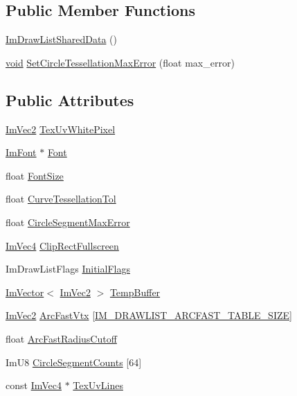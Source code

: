 \subsection*{Public Member Functions}
\begin{DoxyCompactItemize}
\item 
\hyperlink{structImDrawListSharedData_a3fe9d30c0df68cce4db9d2033ba9a589}{Im\+Draw\+List\+Shared\+Data} ()
\item 
\hyperlink{imgui__impl__opengl3__loader_8h_ac668e7cffd9e2e9cfee428b9b2f34fa7}{void} \hyperlink{structImDrawListSharedData_adc947304370a6d5ee55a44190e923c8d}{Set\+Circle\+Tessellation\+Max\+Error} (float max\+\_\+error)
\end{DoxyCompactItemize}
\subsection*{Public Attributes}
\begin{DoxyCompactItemize}
\item 
\hyperlink{structImVec2}{Im\+Vec2} \hyperlink{structImDrawListSharedData_a8dff5fc643cab17128012383d75d9ad8}{Tex\+Uv\+White\+Pixel}
\item 
\hyperlink{structImFont}{Im\+Font} $\ast$ \hyperlink{structImDrawListSharedData_a4542431d4afe5320a965fbe52a3cc39f}{Font}
\item 
float \hyperlink{structImDrawListSharedData_a189a412fcd4f66a1d60501ad758d04bd}{Font\+Size}
\item 
float \hyperlink{structImDrawListSharedData_a5b5bb46f5fd714b43e4b73a131b7f6f7}{Curve\+Tessellation\+Tol}
\item 
float \hyperlink{structImDrawListSharedData_a2343a659b6e750ab09401615b967df10}{Circle\+Segment\+Max\+Error}
\item 
\hyperlink{structImVec4}{Im\+Vec4} \hyperlink{structImDrawListSharedData_ac8737a7aae92c55d75998a6c9f6f3882}{Clip\+Rect\+Fullscreen}
\item 
Im\+Draw\+List\+Flags \hyperlink{structImDrawListSharedData_a7e00a317793f4ed3ff592b050dfee450}{Initial\+Flags}
\item 
\hyperlink{structImVector}{Im\+Vector}$<$ \hyperlink{structImVec2}{Im\+Vec2} $>$ \hyperlink{structImDrawListSharedData_a1f58df8c68099f8ab1e00c2d4040af5d}{Temp\+Buffer}
\item 
\hyperlink{structImVec2}{Im\+Vec2} \hyperlink{structImDrawListSharedData_ab0c46ef010a2a9d20c0995def13abfe8}{Arc\+Fast\+Vtx} \mbox{[}\hyperlink{imgui__internal_8h_ac149be83e162f3775a56cd66590fc092}{I\+M\+\_\+\+D\+R\+A\+W\+L\+I\+S\+T\+\_\+\+A\+R\+C\+F\+A\+S\+T\+\_\+\+T\+A\+B\+L\+E\+\_\+\+S\+I\+ZE}\mbox{]}
\item 
float \hyperlink{structImDrawListSharedData_aef9a6fbf913823bd0b22aafb7f797c05}{Arc\+Fast\+Radius\+Cutoff}
\item 
Im\+U8 \hyperlink{structImDrawListSharedData_addb4f657df1c707b878e90e86ac776e0}{Circle\+Segment\+Counts} \mbox{[}64\mbox{]}
\item 
const \hyperlink{structImVec4}{Im\+Vec4} $\ast$ \hyperlink{structImDrawListSharedData_a188daa23d26c80699041dee094254754}{Tex\+Uv\+Lines}
\end{DoxyCompactItemize}


